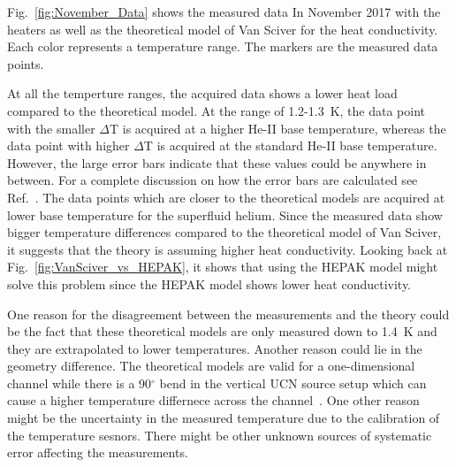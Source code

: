 Fig.~\ref{fig:November_Data} shows the measured data In November 2017
with the heaters as well as the theoretical model of Van Sciver for
the heat conductivity. Each color represents a temperature range. The
markers are the measured data points.

At all the temperture ranges, the acquired data shows a lower heat
load compared to the theoretical model. At the range of 1.2-1.3~K, the
data point with the smaller $\Delta$T is acquired at a higher He-II
base temperature, whereas the data point with higher $\Delta$T is
acquired at the standard He-II base temperature. However, the large
error bars indicate that these values could be anywhere in
between. For a complete discussion on how the error bars are
calculated see Ref.~\cite{Florian_thesis}. The data points which are
closer to the theoretical models are acquired at lower base
temperature for the superfluid helium. Since the measured data show
bigger temperature differences compared to the theoretical model of
Van Sciver, it suggests that the theory is assuming higher heat
conductivity. Looking back at Fig.~\ref{fig:VanSciver_vs_HEPAK}, it
shows that using the HEPAK model might solve this problem since the
HEPAK model shows lower heat conductivity.

One reason for the disagreement between the measurements and the
theory could be the fact that these theoretical models are only
measured down to 1.4~K and they are extrapolated to lower
temperatures. Another reason could lie in the geometry difference. The
theoretical models are valid for a one-dimensional channel while there
is a 90$^\circ$ bend in the vertical UCN source setup which can cause
a higher temperature differnece across the
channel~\cite{Florian_thesis}. One other reason might be the
uncertainty in the measured temperature due to the calibration of the
temperature sesnors. There might be other unknown sources of
systematic error affecting the measurements.


